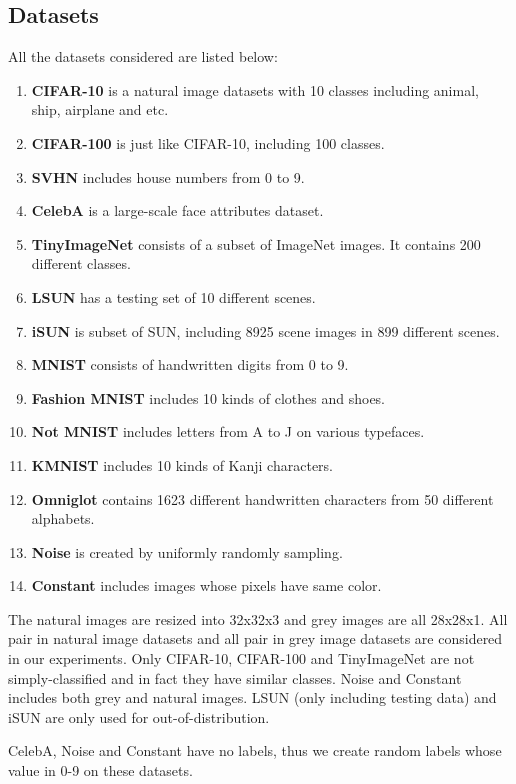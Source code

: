 \documentclass[letterpaper]{article} %
\begin{document}
\subsection{Datasets}
All the datasets considered are listed below:
\begin{enumerate}
	\item \textbf{CIFAR-10} is a natural image datasets with 10 classes including animal, ship, airplane and etc. 
	\item \textbf{CIFAR-100} is just like CIFAR-10, including 100 classes. 
	\item \textbf{SVHN} includes house numbers from 0 to 9. 
	\item \textbf{CelebA} is a large-scale face attributes dataset. 
	\item \textbf{TinyImageNet} consists of a subset of ImageNet images. It contains 200 different classes.
	\item \textbf{LSUN} has a testing set of 10 different scenes. 
	\item \textbf{iSUN} is subset of SUN, including 8925 scene images in 899 different scenes.
	\item \textbf{MNIST} consists of handwritten digits from 0 to 9. 
	\item \textbf{Fashion MNIST} includes 10 kinds of clothes and shoes. 
	\item \textbf{Not MNIST} includes letters from A to J on various typefaces. 
	\item \textbf{KMNIST} includes 10 kinds of Kanji characters.
	\item \textbf{Omniglot} contains 1623 different handwritten characters from 50 different alphabets. 
	\item \textbf{Noise} is created by uniformly randomly sampling. 
	\item \textbf{Constant} includes images whose pixels have same color. 
\end{enumerate}

The natural images are resized into 32x32x3 and grey images are all 28x28x1. All pair in natural image datasets and all pair in grey image datasets are considered in our experiments. Only CIFAR-10, CIFAR-100 and TinyImageNet are not simply-classified and in fact they have similar classes. Noise and Constant includes both grey and natural images. LSUN (only including testing data) and iSUN are only used for out-of-distribution. 

CelebA, Noise and Constant have no labels, thus we create random labels whose value in 0-9 on these datasets. 
\end{document}
